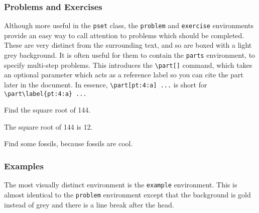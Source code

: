 \documentclass[diagram]{notes}
\begin{document}
\subsubsection{Problems and Exercises}
Although more useful in the \texttt{pset} class, the \texttt{problem} and \texttt{exercise} environments provide an easy way to call attention to problems which should be completed. These are very distinct from the surrounding text, and so are boxed with a light grey background. It is often useful for them to contain the \texttt{parts} environment, to specify multi-step problems. This introduces the \verb|\part[]| command, which takes an optional parameter which acts as a reference label so you can cite the part later in the document. In essence, \verb|\part[pt:4:a] ...| is short for \verb|\part\label{pt:4:a} ...|

\begin{problem}
Find the square root of 144.
\end{problem}
\begin{solution}
The square root of 144 is 12.
\end{solution}

\begin{problem}[Taylor]
\end{problem}

\begin{exercise}
Find some fossils, because fossils are cool.
\end{exercise}

\subsubsection{Examples}
The most visually distinct environment is the \texttt{example} environment. This is almost identical to the \texttt{problem} environment except that the background is gold instead of grey and there is a line break after the head.
\end{document}
